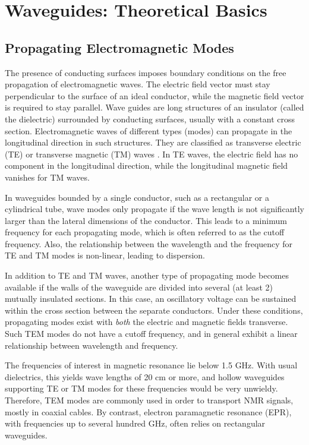 \section{Waveguides: Theoretical Basics}\label{striplines-and-microslots-basics-and-theory}

\subsection{Propagating Electromagnetic Modes}\label{definition-of-a-stripline}

The presence of conducting surfaces imposes boundary conditions on the
free propagation of electromagnetic waves. The electric field vector must stay
perpendicular to the
surface of an ideal conductor, while the magnetic field vector is required to stay parallel.
Wave guides are long structures of an insulator (called the dielectric) surrounded
by conducting surfaces, usually with a constant cross
section. Electromagnetic waves of different types (modes) can propagate
in the longitudinal direction in such structures. They are classified as
transverse electric (TE) or transverse magnetic (TM) waves \cite{Pozar:2012to}. 
In TE waves, the electric field has no component in the longitudinal direction, while
the longitudinal magnetic field vanishes for TM waves. 

In waveguides bounded by a single conductor, such as a rectangular or a cylindrical
tube, wave modes only propagate if the wave length is not significantly larger
than the lateral dimensions of the conductor. This leads to a minimum frequency
for each propagating mode, which is often referred to as the cutoff frequency.
Also, the relationship between the wavelength and the frequency for TE and TM
modes is non-linear, leading to dispersion. 

In addition to TE and TM waves, another type of
propagating mode becomes available if the walls of the waveguide are
divided into several (at least 2) mutually insulated sections. In this
case, an oscillatory voltage can be sustained within the cross section
between the separate conductors. Under these conditions, propagating modes exist with
\textit{both} the electric and magnetic fields transverse. Such TEM
modes do not have a cutoff frequency, and in general exhibit a linear
relationship between wavelength and frequency. 

The frequencies of interest
in magnetic resonance lie below 1.5 GHz. With usual dielectrics, this
yields wave lengths of 20 cm or more, and hollow waveguides supporting TE or TM
modes for these frequencies would be very unwieldy. Therefore, TEM modes are commonly
used in order to transport NMR signals, mostly in coaxial cables. 
By contrast, electron paramagnetic resonance (EPR), with frequencies up
to several hundred GHz, often relies on rectangular waveguides.

